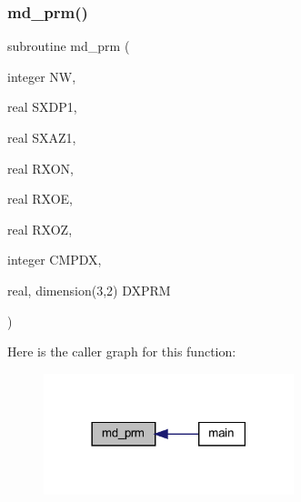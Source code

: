 \subsubsection{\texorpdfstring{md\+\_\+prm()}{md\_prm()}}
{\footnotesize\ttfamily subroutine md\+\_\+prm (\begin{DoxyParamCaption}\item[{integer}]{NW,  }\item[{real}]{S\+X\+D\+P1,  }\item[{real}]{S\+X\+A\+Z1,  }\item[{real}]{R\+X\+ON,  }\item[{real}]{R\+X\+OE,  }\item[{real}]{R\+X\+OZ,  }\item[{integer}]{C\+M\+P\+DX,  }\item[{real, dimension(3,2)}]{D\+X\+P\+RM }\end{DoxyParamCaption})}

Here is the caller graph for this function\+:
\nopagebreak
\begin{figure}[H]
\begin{center}
\leavevmode
\includegraphics[width=206pt]{Marco_8f90_aa2f07b2e4c088385937e889ca561a4c4_icgraph}
\end{center}
\end{figure}
\mbox{\label{Marco_8f90_a3b9b07c27baabf42e767b59314d43d09}} 
